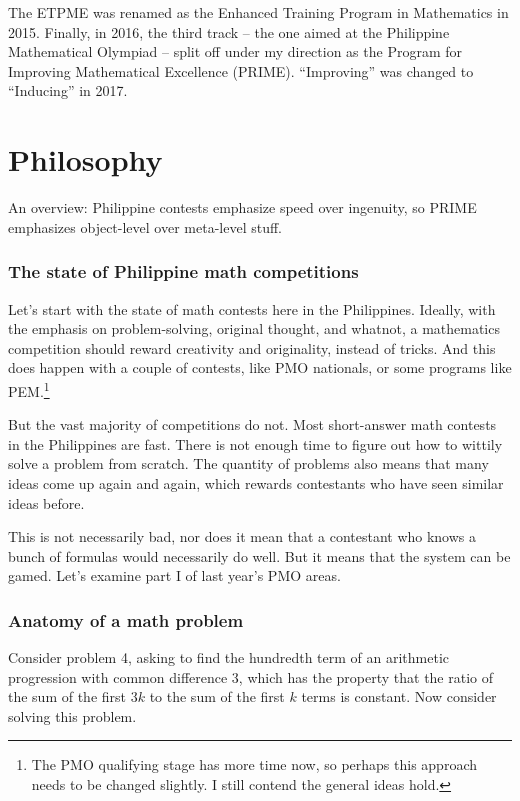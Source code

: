 \documentclass[11pt,paper=letter]{scrartcl}
\begin{document}
The ETPME was renamed as the Enhanced Training Program in Mathematics in 2015. Finally, in 2016, the third track -- the one aimed at the Philippine Mathematical Olympiad -- split off under my direction as the Program for Improving Mathematical Excellence (PRIME). ``Improving'' was changed to ``Inducing'' in 2017.

\section{Philosophy}

An overview: Philippine contests emphasize speed over ingenuity, so PRIME emphasizes object-level over meta-level stuff. 

\subsubsection*{The state of Philippine math competitions}

Let's start with the state of math contests here in the Philippines. Ideally, with the emphasis on problem-solving, original thought, and whatnot, a mathematics competition should reward creativity and originality, instead of tricks. And this does happen with a couple of contests, like PMO nationals, or some programs like PEM.\footnote{The PMO qualifying stage has more time now, so perhaps this approach needs to be changed slightly. I still contend the general ideas hold.}

But the vast majority of competitions do not. Most short-answer math contests in the Philippines are fast. There is not enough time to figure out how to wittily solve a problem from scratch. The quantity of problems also means that many ideas come up again and again, which rewards contestants who have seen similar ideas before.

This is not necessarily bad, nor does it mean that a contestant who knows a bunch of formulas would necessarily do well. But it means that the system can be gamed. Let's examine part I of last year's PMO areas.

\subsubsection*{Anatomy of a math problem}

Consider problem 4, asking to find the hundredth term of an arithmetic progression with common difference $3$, which has the property that the ratio of the sum of the first $3k$ to the sum of the first $k$ terms is constant. Now consider solving this problem.
\end{document}

